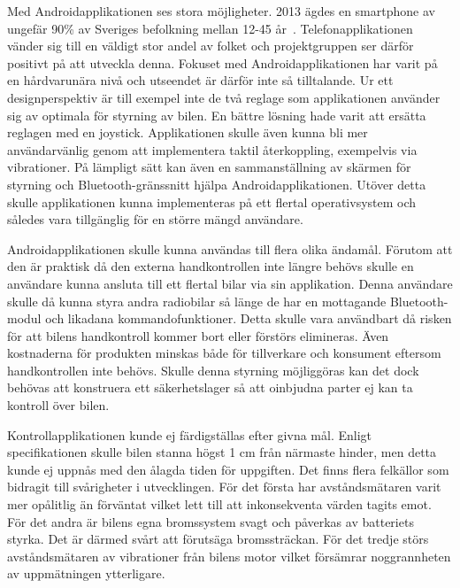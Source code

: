 \documentclass[a4paper]{article}
\begin{document}
\vspace{5mm} \noindent
Med Androidapplikationen ses stora möjligheter. 2013 ägdes en smartphone av ungefär 90\% av Sveriges befolkning mellan 12-45 år~\cite{smartphoneStat}. Telefonapplikationen vänder sig till en väldigt stor andel av folket och projektgruppen ser därför positivt på att utveckla denna. Fokuset med Androidapplikationen har varit på en hårdvarunära nivå och utseendet är därför inte så tilltalande. Ur ett designperspektiv är till exempel inte de två reglage som applikationen använder sig av optimala för styrning av bilen. En bättre lösning hade varit att ersätta reglagen med en joystick. Applikationen skulle även kunna bli mer användarvänlig genom att implementera taktil återkoppling, exempelvis via vibrationer. På lämpligt sätt kan även en sammanställning av skärmen för styrning och Bluetooth-gränssnitt hjälpa Androidapplikationen. Utöver detta skulle applikationen kunna implementeras på ett flertal operativsystem och således vara tillgänglig för en större mängd användare. 

\vspace{5mm} \noindent
Androidapplikationen skulle kunna användas till flera olika ändamål. Förutom att den är praktisk då den externa handkontrollen inte längre behövs skulle en användare kunna ansluta till ett flertal bilar via sin applikation. Denna användare skulle då kunna styra andra radiobilar så länge de har en mottagande Bluetooth-modul och likadana kommandofunktioner. Detta skulle vara användbart då risken för att bilens handkontroll kommer bort eller förstörs elimineras. Även kostnaderna för produkten minskas både för tillverkare och konsument eftersom handkontrollen inte behövs. Skulle denna styrning möjliggöras kan det dock behövas att konstruera ett säkerhetslager så att oinbjudna parter ej kan ta kontroll över bilen.



\newpage
\noindent
Kontrollapplikationen kunde ej färdigställas efter givna mål. Enligt specifikationen skulle bilen stanna högst 1 cm från närmaste hinder, men detta kunde ej uppnås med den ålagda tiden för uppgiften. Det finns flera felkällor som bidragit till svårigheter i utvecklingen. För det första har avståndsmätaren varit mer opålitlig än förväntat vilket lett till att inkonsekventa värden tagits emot. För det andra är bilens egna bromssystem svagt och påverkas av batteriets styrka. Det är därmed svårt att förutsäga bromssträckan. För det tredje störs avståndsmätaren av vibrationer från bilens motor vilket försämrar noggrannheten av uppmätningen ytterligare. 
\end{document}
